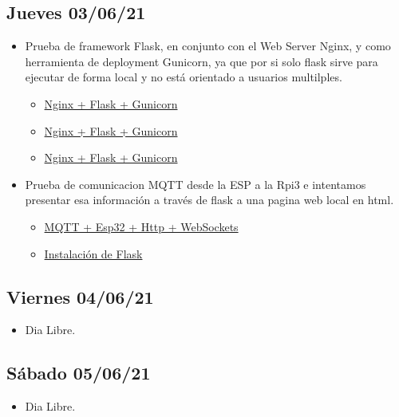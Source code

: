 \subsection*{Jueves 03/06/21}
    \begin{itemize}
        \item Prueba de framework Flask, en conjunto con el Web Server Nginx, y como herramienta de deployment Gunicorn, ya que por si solo flask sirve para ejecutar de forma local y no está orientado a usuarios multilples.
        \begin{itemize}
            \item \href{https://linuxhint.com/use-nginx-with-flask/}{Nginx + Flask + Gunicorn}
            \item \href{https://j2logo.com/tutorial-flask-leccion-17-desplegar-flask-produccion-nginx-gunicorn/}{Nginx + Flask + Gunicorn}
            \item \href{https://faun.pub/deploy-flask-app-with-nginx-using-gunicorn-7fda4f50066a}{Nginx + Flask + Gunicorn}
        \end{itemize}
        
        \item Prueba de comunicacion MQTT desde la ESP a la Rpi3 e intentamos presentar esa información a través de flask a una pagina web local en html.
        \begin{itemize}
            \item \href{https://www.rosietheredrobot.com/2018/11/red-current-and-serial.html}{MQTT + Esp32 + Http + WebSockets}
            \item \href{https://www.rosietheredrobot.com/2017/09/a-web-of-pies.html}{Instalación de Flask}
        \end{itemize}
    \end{itemize}
\subsection*{Viernes 04/06/21}
    \begin{itemize}
        \item Dia Libre.
    \end{itemize}

\subsection*{Sábado 05/06/21}
    \begin{itemize}
        \item Dia Libre.
    \end{itemize}

